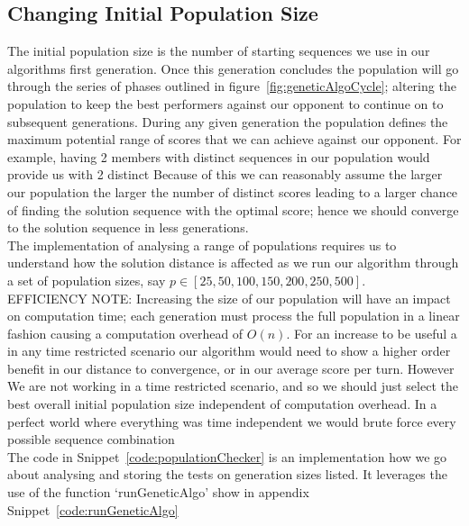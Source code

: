 \subsection{Changing Initial Population Size}\label{ssec:changingInitialPopulationSize}
The initial population size is the number of starting sequences we use in our algorithms first generation.
Once this generation concludes the population will go through the series of phases outlined in figure~\ref{fig:geneticAlgoCycle}; altering the population to keep the best performers against our opponent to continue on to subsequent generations.
During any given generation the population defines the maximum potential range of scores that we can achieve against our opponent.
For example, having 2 members with distinct sequences in our population would provide us with 2 distinct
Because of this we can reasonably assume the larger our population the larger the number of distinct scores leading to a larger chance of finding the solution sequence with the optimal score; hence we should converge to the solution sequence in less generations.\\

The implementation of analysing a range of populations requires us to understand how the solution distance is affected as we run our algorithm through a set of population sizes, say \(p \in [25,50,100,150,200,250,500]\).\\

EFFICIENCY NOTE\@: Increasing the size of our population will have an impact on computation time; each generation must process the full population in a linear fashion causing a computation overhead of \(O(n)\). 
For an increase to be useful a in any time restricted scenario our algorithm would need to show a higher order benefit in our distance to convergence, or in our average score per turn.
However We are not working in a time restricted scenario, and so we should just select the best overall initial population size independent of computation overhead.
In a perfect world where everything was time independent we would brute force every possible sequence combination\\

The code in Snippet~\ref{code:populationChecker} is an implementation how we go about analysing and storing the tests on generation sizes listed. It leverages the use of the function `runGeneticAlgo' show in appendix Snippet~\ref{code:runGeneticAlgo} \\


